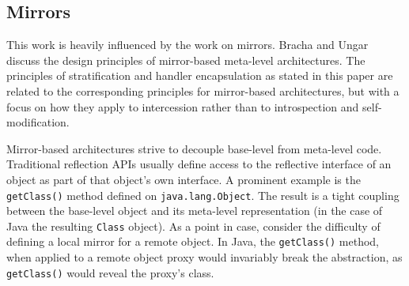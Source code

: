 \documentclass{sig-alternate}
\newcommand{\noSuchMethod}{\texttt{\_\_noSuchMethod\_\_}}
\begin{document}



\subsection{Mirrors}
\label{sub:mirrors}

This work is heavily influenced by the work on mirrors. Bracha and Ungar~\cite{bracha04mirrors} discuss the design principles of mirror-based meta-level architectures. The principles of stratification and handler encapsulation as stated in this paper are related to the corresponding principles for mirror-based architectures, but with a focus on how they apply to intercession rather than to introspection and self-modification.

Mirror-based architectures strive to decouple base-level from meta-level code. Traditional reflection APIs usually define access to the reflective interface of an object as part of that object's own interface. A prominent example is the \texttt{getClass()} method defined on \texttt{java.lang.Object}. The result is a tight coupling between the base-level object and its meta-level representation (in the case of Java the resulting \texttt{Class} object). As a point in case, consider the difficulty of defining a local mirror for a remote object. In Java, the \texttt{getClass()} method, when applied to a remote object proxy would invariably break the abstraction, as \texttt{getClass()} would reveal the proxy's class.
\end{document}

